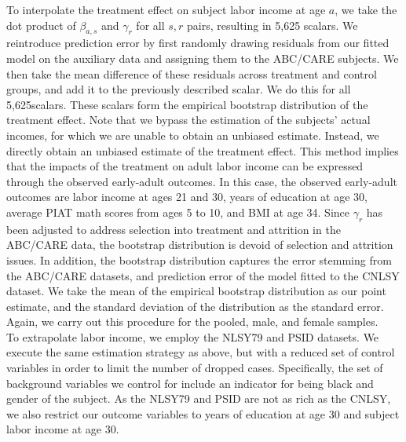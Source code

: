 \noindent To interpolate the treatment effect on subject labor income at age $a$, we take the dot product
of $\beta_{a, s}$ and $\gamma_r$ for all $s,r$ pairs, resulting in 5,625 scalars. We reintroduce
prediction error by first randomly drawing residuals from our fitted model on the auxiliary data and assigning
them to the ABC/CARE subjects. We then take the mean difference of these residuals across treatment and control
groups, and add it to the previously described scalar. We do this for all 5,625scalars. These scalars form the empirical
bootstrap distribution of the treatment effect. Note that
we bypass the estimation of the subjects' actual incomes, for which we are unable to obtain an
unbiased estimate. Instead, we directly obtain an unbiased estimate of the treatment effect. This
method implies that the impacts of the treatment on adult labor income can be expressed through
the observed early-adult outcomes. In this case, the observed early-adult outcomes are labor income at ages 21 and
30, years of education at age 30, average PIAT math scores from ages 5 to 10, and BMI at age 34. Since $\gamma_r$ has
been adjusted to address selection into treatment and attrition in the ABC/CARE data, the bootstrap distribution
is devoid of selection and attrition issues. In addition, the bootstrap distribution captures
the error stemming from the ABC/CARE datasets, and prediction error of the model fitted to the CNLSY dataset.
We take the mean of the empirical bootstrap distribution as our point estimate, and the standard deviation
of the distribution as the standard error. Again, we carry out this procedure for the
pooled, male, and female samples. \\

\noindent To extrapolate labor income, we employ the NLSY79 and PSID datasets. We execute the same estimation
strategy as above, but with a reduced set of control variables in order to limit the number
of dropped cases. Specifically, the set of background variables we control for include an indicator for
being black and gender of the subject. As the NLSY79 and PSID are not as rich as the CNLSY, we also
restrict our outcome variables to years of education at age 30 and subject labor income at age 30. \\

